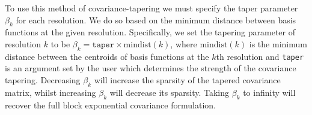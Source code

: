 \documentclass[12pt,a4paper]{article}
\begin{document}
\begin{appendices}



To use this method of covariance-tapering we must specify the taper parameter $\beta_k$ for each resolution. 
We do so based on the minimum distance between basis functions at the given resolution. Specifically, we set the tapering parameter of resolution $k$ to be $\beta_k = \texttt{taper} \times \text{mindist}(k)$, where $\text{mindist}(k)$ is the minimum distance between the centroids of basis functions at the $k$th resolution and \texttt{taper} is an argument set by the user which determines the strength of the covariance tapering. 
Decreasing $\beta_k$ will increase the sparsity of 
the tapered covariance matrix, %
 whilst increasing $\beta_k$ will decrease 
 its sparsity.  
  Taking $\beta_k$ to infinity will recover the full block exponential covariance formulation.%


\end{appendices}
\end{document}

